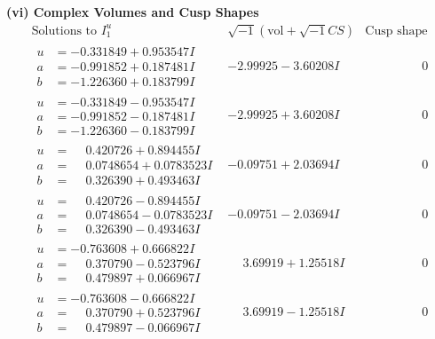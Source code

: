 \documentclass[1p]{elsarticle_modified}
\theoremstyle{definition}
\newcommand{\I}{\sqrt{-1}}
\begin{document}
\newpage\flushleft \textbf{(vi) Complex Volumes and Cusp Shapes}
$$\begin{array}{c|c|c}  
\text{Solutions to }I^u_{1}& \I (\text{vol} + \sqrt{-1}CS) & \text{Cusp shape}\\
 \hline 
\begin{aligned}
u &= -0.331849 + 0.953547 I \\
a &= -0.991852 + 0.187481 I \\
b &= -1.226360 + 0.183799 I\end{aligned}
 & -2.99925 - 3.60208 I & \phantom{-0.000000 } 0 \\ \hline\begin{aligned}
u &= -0.331849 - 0.953547 I \\
a &= -0.991852 - 0.187481 I \\
b &= -1.226360 - 0.183799 I\end{aligned}
 & -2.99925 + 3.60208 I & \phantom{-0.000000 } 0 \\ \hline\begin{aligned}
u &= \phantom{-}0.420726 + 0.894455 I \\
a &= \phantom{-}0.0748654 + 0.0783523 I \\
b &= \phantom{-}0.326390 + 0.493463 I\end{aligned}
 & -0.09751 + 2.03694 I & \phantom{-0.000000 } 0 \\ \hline\begin{aligned}
u &= \phantom{-}0.420726 - 0.894455 I \\
a &= \phantom{-}0.0748654 - 0.0783523 I \\
b &= \phantom{-}0.326390 - 0.493463 I\end{aligned}
 & -0.09751 - 2.03694 I & \phantom{-0.000000 } 0 \\ \hline\begin{aligned}
u &= -0.763608 + 0.666822 I \\
a &= \phantom{-}0.370790 - 0.523796 I \\
b &= \phantom{-}0.479897 + 0.066967 I\end{aligned}
 & \phantom{-}3.69919 + 1.25518 I & \phantom{-0.000000 } 0 \\ \hline\begin{aligned}
u &= -0.763608 - 0.666822 I \\
a &= \phantom{-}0.370790 + 0.523796 I \\
b &= \phantom{-}0.479897 - 0.066967 I\end{aligned}
 & \phantom{-}3.69919 - 1.25518 I & \phantom{-0.000000 } 0 \\ \hline\begin{aligned}

\end{aligned}
\end{array}$$
\end{document}

